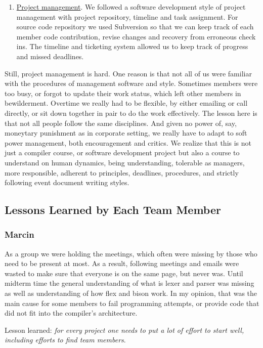 \begin{enumerate}
\item \underline{Project management}. We followed a software development
style of project management with project repository, timeline and task
assignment. For source code repository we used Subversion so that we can
keep track of each member code contribution, revise changes and recovery
from erroneous check ins. The timeline and ticketing system allowed us to
keep track of progress and missed deadlines.
\end{enumerate}

Still, project management is hard. One reason is that not all of us were
familiar with the procedures of management software and style. Sometimes
members were too busy, or forgot to update their work status, which left
other members in bewilderment. Overtime we really had to be flexible, by
either emailing or call directly, or sit down together in pair to do the
work effectively. The lesson here is that not all people follow the same
disciplines. And given no power of, say, moneytary punishment as in
corporate setting, we really have to adapt to soft power management, both
encouragement and critics. We realize that this is not just a compiler
course, or software development project but also a course to understand on 
human dynamics, being understanding, tolerable as managers, more
responsible, adherent to principles, deadlines, procedures, and strictly
following event document writing styles.

\subsection{Lessons Learned by Each Team Member}

\subsubsection{Marcin}

As a group we were holding the meetings, which often were missing by those 
who need to be present at most. As a result, following meetings and emails 
were wasted to make sure that everyone is on the same page, but never was.
Until midterm time the general understanding of what is lexer and parser
was missing as well as understanding of how flex and bison work. In my
opinion, that was the main cause for some members to fail programming
attempts, or provide code that did not fit into the compiler's
architecture. 

Lesson learned: \textit{for every project one needs to put a lot of
effort to start well, including efforts to find team members}.

